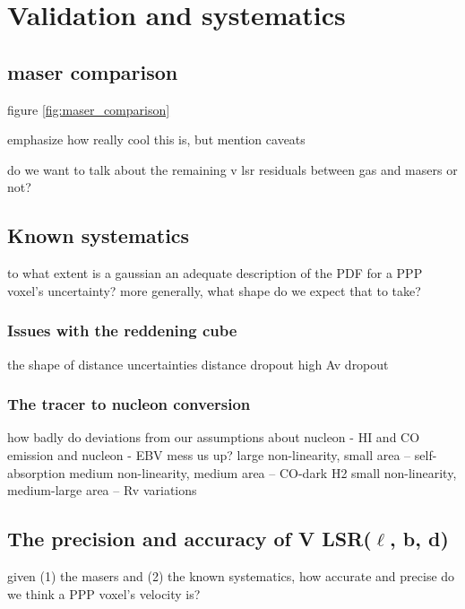 \section{Validation and systematics}

\subsection{\citet{2009ApJ...700..137R} maser comparison}
figure \ref{fig:maser_comparison}

emphasize how really cool this is, but mention caveats

do we want to talk about the remaining v lsr residuals between gas and masers or not?

\subsection{Known systematics}
to what extent is a gaussian an adequate description of the PDF for a PPP voxel's uncertainty? more generally, what shape do we expect that to take?

\subsubsection{Issues with the reddening cube}
the shape of distance uncertainties
distance dropout
high Av dropout

\subsubsection{The tracer to nucleon conversion}
how badly do deviations from our assumptions about nucleon - HI and CO emission and nucleon - EBV mess us up?
large non-linearity, small area -- self-absorption
medium non-linearity, medium area -- CO-dark H2
small non-linearity, medium-large area -- Rv variations

\subsection{The precision and accuracy of V LSR($\ell$, b, d)}
given (1) the masers and (2) the known systematics, how accurate and precise do we think a PPP voxel's velocity is?